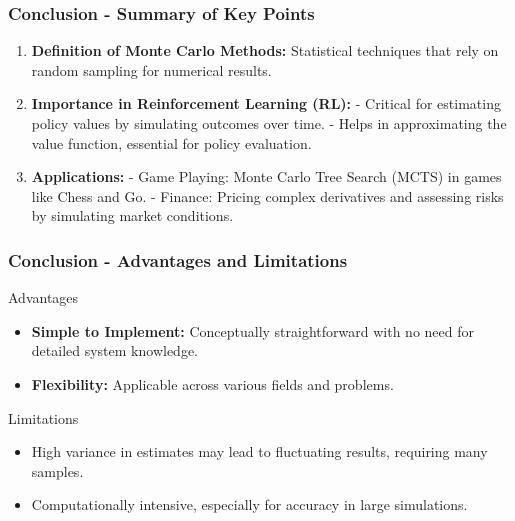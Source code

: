 \documentclass[aspectratio=169]{beamer}
\begin{document}
\begin{frame}[fragile]
    \frametitle{Conclusion - Summary of Key Points}
    
    \begin{enumerate}
        \item \textbf{Definition of Monte Carlo Methods:} 
        Statistical techniques that rely on random sampling for numerical results.

        \item \textbf{Importance in Reinforcement Learning (RL):} 
        - Critical for estimating policy values by simulating outcomes over time.
        - Helps in approximating the value function, essential for policy evaluation.

        \item \textbf{Applications:} 
        - Game Playing: Monte Carlo Tree Search (MCTS) in games like Chess and Go.
        - Finance: Pricing complex derivatives and assessing risks by simulating market conditions.
    \end{enumerate}
\end{frame}

\begin{frame}[fragile]
    \frametitle{Conclusion - Advantages and Limitations}

    \begin{block}{Advantages}
        \begin{itemize}
            \item \textbf{Simple to Implement:} Conceptually straightforward with no need for detailed system knowledge.
            \item \textbf{Flexibility:} Applicable across various fields and problems.
        \end{itemize}
    \end{block}

    \begin{block}{Limitations}
        \begin{itemize}
            \item High variance in estimates may lead to fluctuating results, requiring many samples.
            \item Computationally intensive, especially for accuracy in large simulations.
        \end{itemize}
    \end{block}
\end{frame}
\end{document}

